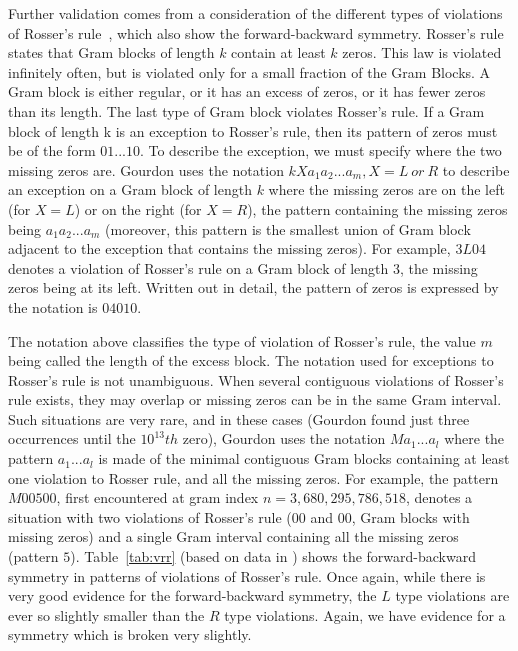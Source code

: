 \documentclass[twoside]{article}
\begin{document}
Further validation comes from a consideration of the different types of violations of Rosser's rule~\cite{gourdon}, which also show the forward-backward symmetry. Rosser's rule states that Gram blocks of length $k$ contain at least $k$ zeros. This law is violated infinitely often, but is violated only for a small fraction of the Gram Blocks. A Gram block is either regular, or it has an excess of zeros, or it has fewer zeros than its length. The last type of Gram block violates Rosser's rule. 
If a Gram block of length k is an exception to Rosser's rule, then its pattern of zeros must be of the form $01...10$. To describe the exception, we must specify where the two missing zeros are. Gourdon uses the notation $kXa_1a_2 . . . a_m, X = L~or~R $ 
to describe an exception on a Gram block of length $k$  where the missing zeros are on the left (for $X = L$) or on the right (for $X = R$), the pattern containing the missing zeros being $a_1a_2 . . . a_m$ (moreover, this pattern is the smallest union of Gram block adjacent to the exception that contains the missing zeros). For example, $3L04$ denotes a violation of Rosser's rule on a Gram block of length 3, the missing zeros being at its left. Written out in detail, the pattern of zeros is expressed by the notation is $04010$.

The notation above classifies the type of violation of Rosser's rule, the value $m$ being called the length of the excess block. The notation used for exceptions to Rosser's rule is not unambiguous. When several contiguous violations of Rosser's rule exists, they may overlap or missing zeros can be in the same Gram interval. Such situations are very rare, and in these cases (Gourdon found just three occurrences until the $10^{13}th$ zero), Gourdon uses the notation $Ma_1 ...a_l$ where the pattern $a_1 . . . a_l$ is made of the minimal contiguous Gram blocks containing at least one violation to Rosser rule, and all the missing zeros. For example, the pattern $M00500$, first encountered at gram index $n = 3,680,295,786,518$, denotes a situation with two violations of Rosser's rule ($00$ and $00$, Gram blocks with missing zeros) and a single Gram interval containing all the missing zeros (pattern $5$). 
Table~\ref{tab:vrr}  (based on data in \cite{gourdon}) shows the forward-backward symmetry in patterns of violations of Rosser's rule. Once again, while there is very good evidence for the forward-backward symmetry, the $L$ type violations are ever so slightly smaller than the $R$ type violations. Again, we have evidence for a symmetry which is broken very slightly.
\end{document}
